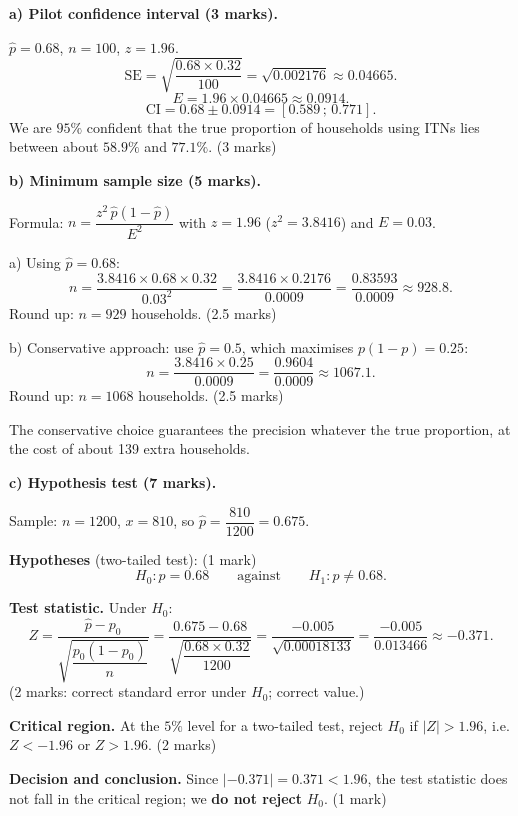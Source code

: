 \documentclass[11pt]{article}
\begin{document}
\begin{corrige}
\textbf{a) Pilot confidence interval (3 marks).}

$\hat{p} = 0.68$, $n = 100$, $z = 1.96$.
\[ \mathrm{SE} = \sqrt{\frac{0.68 \times 0.32}{100}} = \sqrt{0.002176} \approx 0.04665. \]
\[ E = 1.96 \times 0.04665 \approx 0.0914. \]
\[ \mathrm{CI} = 0.68 \pm 0.0914 = [0.589\,;\,0.771]. \]
We are $95\%$ confident that the true proportion of households using ITNs lies between about $58.9\%$ and $77.1\%$. \hfill (3 marks)

\textbf{b) Minimum sample size (5 marks).}

Formula: $n = \dfrac{z^2\,\hat{p}(1-\hat{p})}{E^2}$ with $z = 1.96$ ($z^2 = 3.8416$) and $E = 0.03$.

a) Using $\hat{p} = 0.68$:
\[ n = \frac{3.8416 \times 0.68 \times 0.32}{0.03^2} = \frac{3.8416 \times 0.2176}{0.0009} = \frac{0.83593}{0.0009} \approx 928.8. \]
Round up: $n = 929$ households. \hfill (2.5 marks)

b) Conservative approach: use $\hat{p} = 0.5$, which maximises $p(1-p) = 0.25$:
\[ n = \frac{3.8416 \times 0.25}{0.0009} = \frac{0.9604}{0.0009} \approx 1067.1. \]
Round up: $n = 1068$ households. \hfill (2.5 marks)

The conservative choice guarantees the precision whatever the true proportion, at the cost of about 139 extra households.

\textbf{c) Hypothesis test (7 marks).}

Sample: $n = 1200$, $x = 810$, so $\hat{p} = \dfrac{810}{1200} = 0.675$.

\textbf{Hypotheses} (two-tailed test): \hfill (1 mark)
\[ H_0 : p = 0.68 \qquad \text{against} \qquad H_1 : p \neq 0.68. \]

\textbf{Test statistic.} Under $H_0$:
\[ Z = \frac{\hat{p} - p_0}{\sqrt{\dfrac{p_0(1-p_0)}{n}}} = \frac{0.675 - 0.68}{\sqrt{\dfrac{0.68 \times 0.32}{1200}}} = \frac{-0.005}{\sqrt{0.00018133}} = \frac{-0.005}{0.013466} \approx -0.371. \]
(2 marks: correct standard error under $H_0$; correct value.)

\textbf{Critical region.} At the $5\%$ level for a two-tailed test, reject $H_0$ if $|Z| > 1.96$, i.e. $Z < -1.96$ or $Z > 1.96$. \hfill (2 marks)

\textbf{Decision and conclusion.} Since $|-0.371| = 0.371 < 1.96$, the test statistic does not fall in the critical region; we \textbf{do not reject} $H_0$. \hfill (1 mark)


\end{corrige}
\end{document}
